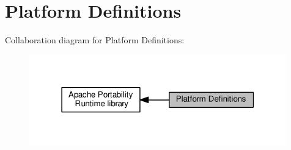 \hypertarget{group__apr__platform}{}\section{Platform Definitions}
\label{group__apr__platform}
Collaboration diagram for Platform Definitions\+:
\nopagebreak
\begin{figure}[H]
\begin{center}
\leavevmode
\includegraphics[width=315pt]{group__apr__platform}
\end{center}
\end{figure}
